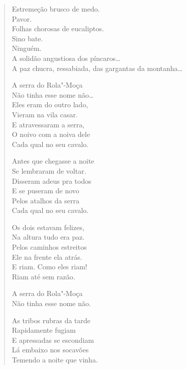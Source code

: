 {\begin{verse}
Estremeção brusco de medo.\\
Pavor.\\
Folhas chorosas de eucaliptos.\\
Sino bate.\\
Ninguém.\\
A solidão angustiosa dos píncaros\ldots{}\\
A paz chucra, ressabiada, das gargantas da montanha\ldots{}


\quad\quad\quad{}A serra do Rola"-Moça\\
\quad\quad\quad{}Não tinha esse nome não\ldots{}\\
\quad\quad\quad{}Eles eram do outro lado,\\
\quad\quad\quad{}Vieram na vila casar.\\
\quad\quad\quad{}E atravessaram a serra,\\
\quad\quad\quad{}O noivo com a noiva dele\\
\quad\quad\quad{}Cada qual no seu cavalo.

\quad\quad\quad{}Antes que chegasse a noite\\
\quad\quad\quad{}Se lembraram de voltar.\\
\quad\quad\quad{}Disseram adeus pra todos\\
\quad\quad\quad{}E se puseram de novo\\
\quad\quad\quad{}Pelos atalhos da serra\\
\quad\quad\quad{}Cada qual no seu cavalo.

\quad\quad\quad{}Os dois estavam felizes,\\
\quad\quad\quad{}Na altura tudo era paz.\\
\quad\quad\quad{}Pelos caminhos estreitos\\
\quad\quad\quad{}Ele na frente ela atrás.\\
\quad\quad\quad{}E riam. Como eles riam!\\
\quad\quad\quad{}Riam até sem razão.

\quad\quad\quad{}A serra do Rola"-Moça\\
\quad\quad\quad{}Não tinha esse nome não.

\quad\quad\quad{}As tribos rubras da tarde\\
\quad\quad\quad{}Rapidamente fugiam\\
\quad\quad\quad{}E apressadas se escondiam\\
\quad\quad\quad{}Lá embaixo nos socavões\\
\quad\quad\quad{}Temendo a noite que vinha.


\end{verse}}
